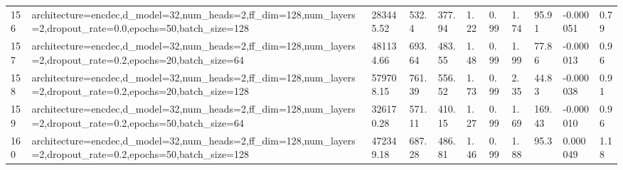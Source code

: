 \begin{longtable}{C{0.8cm} L{2cm} C{1.15cm} C{1.15cm} C{1.15cm} C{1.15cm} C{0.85cm} C{1.25cm} C{1.2cm} C{1.5cm} C{1.0cm}}
156 & architecture=encdec,\newline d\_model=32,\newline num\_heads=2,\newline ff\_dim=128,\newline num\_layers=2,\newline dropout\_rate=0.0,\newline epochs=50,\newline batch\_size=128 & 283445.52 & 532.4 & 377.94 & 1.22 & 0.99 & 1.74 & 95.91 & -0.000051 & 0.79 \\
157 & architecture=encdec,\newline d\_model=32,\newline num\_heads=2,\newline ff\_dim=128,\newline num\_layers=2,\newline dropout\_rate=0.2,\newline epochs=20,\newline batch\_size=64 & 481134.66 & 693.64 & 483.55 & 1.48 & 0.99 & 1.99 & 77.86 & -0.000013 & 0.96 \\
158 & architecture=encdec,\newline d\_model=32,\newline num\_heads=2,\newline ff\_dim=128,\newline num\_layers=2,\newline dropout\_rate=0.2,\newline epochs=20,\newline batch\_size=128 & 579708.15 & 761.39 & 556.52 & 1.73 & 0.99 & 2.35 & 44.83 & -0.000038 & 0.91 \\
159 & architecture=encdec,\newline d\_model=32,\newline num\_heads=2,\newline ff\_dim=128,\newline num\_layers=2,\newline dropout\_rate=0.2,\newline epochs=50,\newline batch\_size=64 & 326170.28 & 571.11 & 410.15 & 1.27 & 0.99 & 1.69 & 169.43 & -0.000010 & 0.96 \\
160 & architecture=encdec,\newline d\_model=32,\newline num\_heads=2,\newline ff\_dim=128,\newline num\_layers=2,\newline dropout\_rate=0.2,\newline epochs=50,\newline batch\_size=128 & 472349.18 & 687.28 & 486.81 & 1.46 & 0.99 & 1.88 & 95.3 & 0.000049 & 1.18 \\

\end{longtable}
